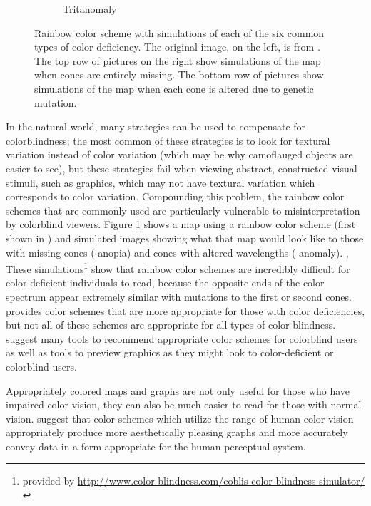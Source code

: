 \documentclass[11pt]{isuthesis}\usepackage[]{graphicx}\usepackage[]{color}
\newcommand{\comment}[2][inline]{\todo[color=SkyBlue, #1]{#2}} %
\begin{document}
\begin{figure}[!htbp]
\begin{minipage}[c]{.75\textwidth}
\begin{subfigure}[b]{.32\textwidth}
  \caption{Tritanomaly}
\end{subfigure}\hfil
\end{minipage}

\caption[Colorblindness and Rainbow Color Schemes]{Rainbow color scheme with simulations of each of the six common types of color deficiency. The original image, on the left, is from \protect\citet{light2004end}. The top row of pictures on the right show simulations of the map when cones are entirely missing. The bottom row of pictures show simulations of the map when each cone is altered due to genetic mutation. }\label{fig:colorblindrainbow}
\end{figure}

In the natural world, many strategies can be used to compensate for colorblindness; the most common of these strategies is to look for textural variation instead of color variation (which may be why camoflauged objects are easier to see), but these strategies fail when viewing abstract, constructed visual stimuli, such as graphics, which may not have textural variation which corresponds to color variation. Compounding this problem, the rainbow color schemes that are commonly used are particularly vulnerable to misinterpretation by colorblind viewers. Figure \ref{fig:colorblindrainbow} shows a map using a rainbow color scheme (first shown in \citet{light2004end}) and simulated images showing what that map would look like to those with missing cones (-anopia) and cones with altered wavelengths (-anomaly). , These simulations\footnote{provided by \url{http://www.color-blindness.com/coblis-color-blindness-simulator/}} show that rainbow color schemes are incredibly difficult for color-deficient individuals to read, because the opposite ends of the color spectrum appear extremely similar with mutations to the first or second cones. \citet{light2004end} provides color schemes that are more appropriate for those with color deficiencies, but not all of these schemes are appropriate for all types of color blindness. \citet{silva2011using} suggest many tools to recommend appropriate color schemes for colorblind users as well as tools to preview graphics as they might look to color-deficient or colorblind users. 

Appropriately colored maps and graphs are not only useful for those who have impaired color vision, they can also be much easier to read for those with normal vision. \citet{rainbowcolor} suggest that color schemes which utilize the range of human color vision appropriately produce more aesthetically pleasing graphs and more accurately convey data in a form appropriate for the human perceptual system. 
\end{document}
